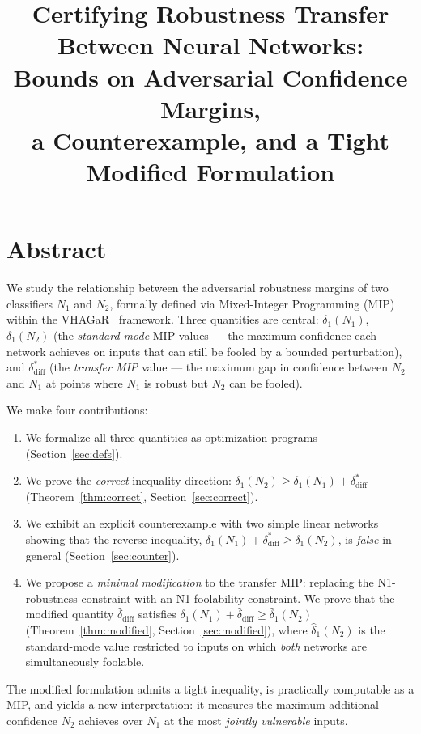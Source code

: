 \documentclass[12pt]{article}
\title{%
  Certifying Robustness Transfer Between Neural Networks:\\[6pt]
  \large Bounds on Adversarial Confidence Margins,\\
  a Counterexample, and a Tight Modified Formulation}
\author{}
\date{}
\theoremstyle{definition}
\theoremstyle{plain}
\theoremstyle{remark}
\begin{document}
\maketitle
\tableofcontents
\newpage

\section{Abstract}

We study the relationship between the adversarial robustness margins
of two classifiers $N_1$ and $N_2$, formally defined via Mixed-Integer
Programming (MIP) within the VHAGaR~\cite{vaghar} framework.
Three quantities are central: $\delta_1(N_1)$, $\delta_1(N_2)$
(the \emph{standard-mode} MIP values — the maximum confidence each
network achieves on inputs that can still be fooled by a bounded
perturbation), and $\delta_{\mathrm{diff}}^*$ (the \emph{transfer MIP}
value — the maximum gap in confidence between $N_2$ and $N_1$ at points
where $N_1$ is robust but $N_2$ can be fooled).

We make four contributions:
\begin{enumerate}
  \item We formalize all three quantities as optimization programs
        (Section~\ref{sec:defs}).
  \item We prove the \emph{correct} inequality direction:
        $\delta_1(N_2) \geq \delta_1(N_1)+\delta_{\mathrm{diff}}^*$
        (Theorem~\ref{thm:correct}, Section~\ref{sec:correct}).
  \item We exhibit an explicit counterexample with two simple linear
        networks showing that the reverse inequality,
        $\delta_1(N_1)+\delta_{\mathrm{diff}}^*\geq\delta_1(N_2)$,
        is \emph{false} in general (Section~\ref{sec:counter}).
  \item We propose a \emph{minimal modification} to the transfer MIP:
        replacing the N1-robustness constraint with an N1-foolability
        constraint. We prove that the modified quantity
        $\hat{\delta}_{\mathrm{diff}}$ satisfies
        $\delta_1(N_1)+\hat{\delta}_{\mathrm{diff}}\geq\hat{\delta}_1(N_2)$
        (Theorem~\ref{thm:modified}, Section~\ref{sec:modified}),
        where $\hat{\delta}_1(N_2)$ is the standard-mode value restricted
        to inputs on which \emph{both} networks are simultaneously foolable.
\end{enumerate}

The modified formulation admits a tight inequality, is practically
computable as a MIP, and yields a new interpretation: it measures the
maximum additional confidence $N_2$ achieves over $N_1$ at the most
\emph{jointly vulnerable} inputs.
\end{document}
